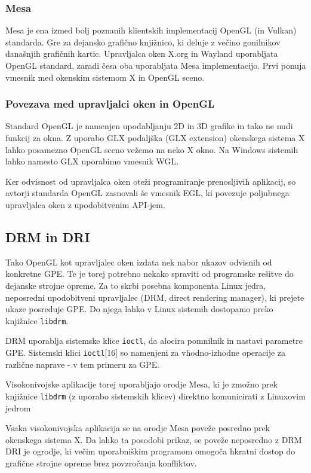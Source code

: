 \documentclass{article}
\begin{document}
\subsubsection{Mesa}
Mesa je ena izmed bolj poznanih klientskih implementacij OpenGL (in Vulkan) standarda. Gre za dejansko grafično knjižnico, ki deluje z večino gonilnikov današnjih grafičnih kartic. Upravljalca oken X.org in Wayland uporabljata OpenGL standard, zaradi česa oba uporabljata Mesa implementacijo. Prvi ponuja vmesnik med okenskim sistemom X in OpenGL sceno.

\subsubsection{Povezava med upravljalci oken in OpenGL}
Standard OpenGL je namenjen upodabljanju 2D in 3D grafike in tako ne nudi funkcij za okna. Z uporabo GLX podaljška (GLX extension) okenskega sistema X lahko posamezno OpenGL sceno vežemo na neko X okno. Na Windows sistemih lahko namesto GLX uporabimo vmesnik WGL.

Ker odvisnost od upravljalca oken oteži programiranje prenosljivih aplikacij, so avtorji standarda OpenGL zasnovali še vmesnik EGL, ki povezuje poljubnega upravljalca oken z upodobitvenim API-jem.

\subsection{DRM in DRI}
Tako OpenGL kot upravljalec oken izdata nek nabor ukazov odvisnih od konkretne GPE. Te je torej potrebno nekako spraviti od programske rešitve do dejanske strojne opreme. Za to skrbi posebna komponenta Linux jedra, neposredni upodobitveni upravljalec (DRM, direct rendering manager), ki prejete ukaze posreduje GPE. Do njega lahko v Linux sistemih dostopamo preko knjižnice \lstinline{libdrm}.

DRM uporablja sistemske klice \lstinline{ioctl}, da alocira pomnilnik in nastavi parametre GPE. Sistemski klici \lstinline{ioctl}[16] so namenjeni za vhodno-izhodne operacije za različne naprave - v tem primeru za GPE.

Visokonivojske aplikacije torej uporabljajo orodje Mesa, ki je zmožno prek knjižnice \lstinline{libdrm} (z uporabo sistemskih klicev) direktno komunicirati z Linuxovim jedrom

Vsaka visokonivojska aplikacija se na orodje Mesa poveže posredno prek okenskega sistema X. Da lahko ta posodobi prikaz, se poveže neposredno z DRM
DRI je ogrodje, ki večim uporabniškim programom omogoča hkratni dostop do grafične strojne opreme brez povzročanja konfliktov.
\end{document}
